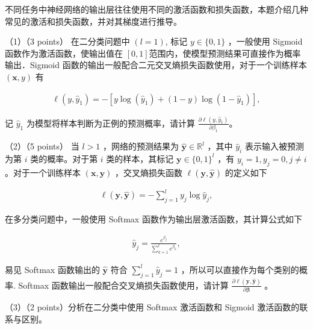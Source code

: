 \documentclass[answers]{exam}  %
\begin{document}
\begin{questions}
\begin{parts}
不同任务中神经网络的输出层往往使用不同的激活函数和损失函数，本题介绍几种常见的激活和损失函数，并对其梯度进行推导。

（1）（3 points） 在二分类问题中 $(l=1)$, 标记 $y \in\{0,1\}$ ，一般使用 Sigmoid 函数作为激活函数，使输出值在 $[0,1]$范围内，使模型预测结果可直接作为概率输出．Sigmoid 函数的输出一般配合二元交叉熵损失函数使用，对于一个训练样本 $(\boldsymbol{x}, y)$ 有

    \begin{align}
            \ell\left(y, \hat{y}_1\right)=-\left[y \log \left(\hat{y}_1\right)+(1-y) \log \left(1-\hat{y}_1\right)\right],
    \end{align}


记 $\hat{y}_1$ 为模型将样本判断为正例的预测概率，请计算 $\frac{\partial \ell\left(y, \hat{y}_1\right)}{\partial \beta_1}$。

（2）（5 points） 当 $l>1$ ，网络的预测结果为 $\hat{\boldsymbol{y}} \in \mathbb{R}^l$ ，其中 $\hat{y}_i$ 表示输入被预测为第 $i$ 类的概率。对于第 $i$ 类的样本，其标记 $\boldsymbol{y} \in\{0,1\}^l$ ，有 $y_i=1, y_j=0, j \neq i$ 。对于一个训练样本 $(\boldsymbol{x}, \boldsymbol{y})$ ，交叉熵损失函数 $\ell(\boldsymbol{y}, \hat{\boldsymbol{y}})$ 的定义如下

    \begin{align}
        \ell(\boldsymbol{y}, \hat{\boldsymbol{y}})=-\sum_{j=1}^l y_j \log \hat{y}_j,
    \end{align}
    
    
    在多分类问题中，一般使用 Softmax 函数作为输出层激活函数，其计算公式如下
    
     \begin{align}
        \hat{y}_j=\frac{e^{\beta_j}}{\sum_{k=1}^l e^{\beta_k}},
    \end{align}
    
    
    易见 Softmax 函数输出的 $\hat{\boldsymbol{y}}$ 符合 $\sum_{j=1}^l \hat{y}_j=1$ ，所以可以直接作为每个类别的概率. Softmax 函数输出一般配合交叉熵损失函数使用，请计算 $\frac{\partial \ell(\boldsymbol{y}, \hat{\boldsymbol{y}})}{\partial \boldsymbol{\beta}}$ 。
    
    （3）（2 points）分析在二分类中使用 Softmax 激活函数和 Sigmoid 激活函数的联系与区别。
    
    
    \end{parts}

\begin{solution}
	\begin{parts}

\end{parts}
\end{solution}
\end{questions}
\end{document}
